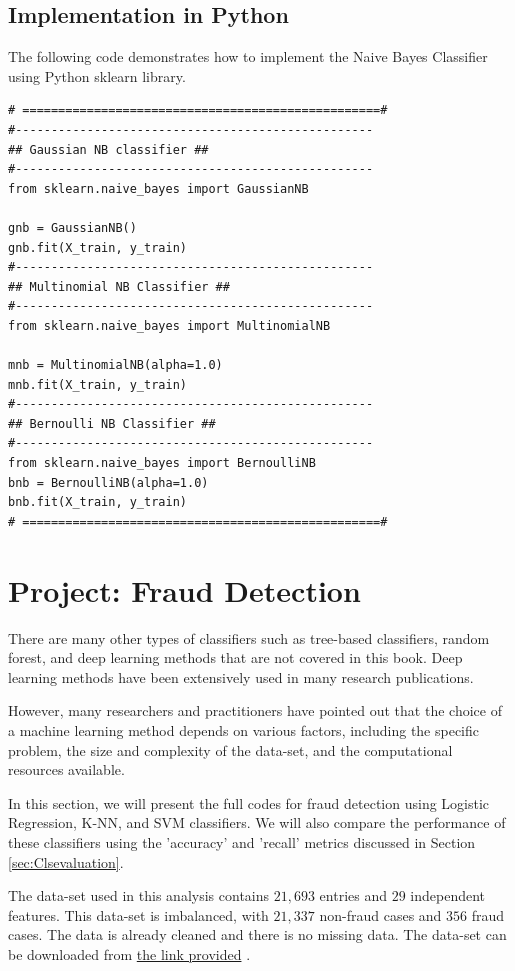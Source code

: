 \newpage

\subsection{Implementation in Python}
The following code demonstrates how to implement the  Naive Bayes Classifier using Python sklearn library.

\begin{lstlisting}
# ==================================================#
#--------------------------------------------------
## Gaussian NB classifier ##
#--------------------------------------------------
from sklearn.naive_bayes import GaussianNB

gnb = GaussianNB()
gnb.fit(X_train, y_train)
#--------------------------------------------------
## Multinomial NB Classifier ##
#--------------------------------------------------
from sklearn.naive_bayes import MultinomialNB

mnb = MultinomialNB(alpha=1.0)
mnb.fit(X_train, y_train)
#--------------------------------------------------
## Bernoulli NB Classifier ##
#--------------------------------------------------
from sklearn.naive_bayes import BernoulliNB
bnb = BernoulliNB(alpha=1.0)
bnb.fit(X_train, y_train)
# ==================================================#
\end{lstlisting}
\newpage
\section{Project: Fraud Detection}\label{sec:cls_proj1}
There are many other types of classifiers such as tree-based classifiers, random forest, and deep learning methods that are not covered in this book. Deep learning methods have been extensively used in many research publications.

However, many researchers and practitioners have pointed out that the choice of a machine learning method depends on various factors, including the specific problem, the size and complexity of the data-set, and the computational resources available.

In this section, we will present the full codes for fraud detection using Logistic Regression, K-NN, and SVM classifiers. We will also compare the performance of these classifiers using the 'accuracy' and 'recall' metrics discussed in Section \ref{sec:Clsevaluation}.

The data-set \cite{web:fraudData} used in this analysis contains $21,693$ entries and $29$ independent features. This data-set is imbalanced, with $21,337$ non-fraud cases and $356$ fraud cases. The data is already cleaned and there is no missing data. The data-set can be downloaded from \href{https://github.com/yonycherkos/Applied-Data-Science-with-Python-Specialization.git}{the link provided} \cite{web:fraudData}.

